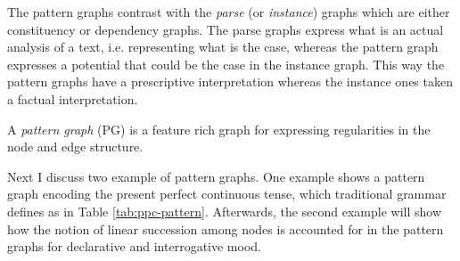 The pattern graphs contrast with the \textit{parse} (or \textit{instance}) graphs which are either constituency or dependency graphs. The parse graphs express what is an actual analysis of a text, i.e. representing what is the case, whereas the pattern graph expresses a potential that could be the case in the instance graph. This way the pattern graphs have a prescriptive interpretation whereas the instance ones taken a factual interpretation. 


\begin{definition}\label{def:graph-pattern}
    A \textit{pattern graph} (PG) is a feature rich graph for expressing regularities in the node and edge structure.
\end{definition}




Next I discuss two example of pattern graphs. One example shows a pattern graph encoding the present perfect continuous tense, which traditional grammar defines as in Table \ref{tab:ppc-pattern}. Afterwards, the second example will show how the notion of linear succession among nodes is accounted for in the pattern graphs for declarative and interrogative mood.

